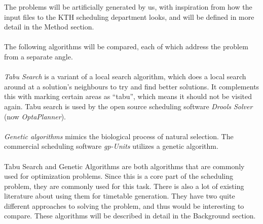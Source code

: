 \documentclass[titlepage,a4paper]{article}
\begin{document}
The problems will be artificially generated by us, with inspiration from how the input files to the KTH scheduling department looks, and will be defined in more detail in the Method section. \\\\
The following algorithms will be compared, each of which address the problem from a separate angle.\\\\
\emph{Tabu Search} is a variant of a local search algorithm, which does a local search around at a solution’s neighbours to try and find better solutions. It complements this with marking certain areas as “tabu”, which means it should not be visited again\cite{aTabuSearch07}. Tabu search is used by the open source scheduling software \emph{Drools Solver} (now \emph{OptaPlanner})\cite{website:timetabling-software-survey}. \\\\
\emph{Genetic algorithms} mimics the biological process of natural selection. The commercial scheduling software \emph{gp-Units} utilizes a genetic algorithm\cite{website:timetabling-software-survey}.\\\\
Tabu Search and Genetic Algorithms are both algorithms that are commonly used for optimization problems. Since this is a core part of the scheduling problem, they are commonly used for this task. There is also a lot of existing literature about using them for timetable generation. They have two quite different approaches to solving the problem, and thus would be interesting to compare.
These algorithms will be described in detail in the Background section.

\pagebreak
\end{document}
